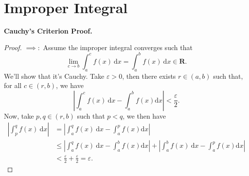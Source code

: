 \documentclass[11pt]{article} %
\theoremstyle{plain}
\newcommand{\R}{\mathbf{R}}
\begin{document}
\section*{Improper Integral}

\textbf{Cauchy's Criterion Proof.}

\begin{proof}
$\implies:$ Assume the improper integral converges such that 
\[\lim_{c\to b}\int_a^c f(x)\ \mathrm{d}x = \int_a^b f(x)\ \mathrm{d}x \in \R.\]
We'll show that it's Cauchy. Take $\varepsilon>0$, then there exists $r\in(a,b)$ such that, for all $c\in(r,b)$, we have
\[\left|\int_a^c f(x)\ \mathrm{d}x- \int_a^b f(x) \mathrm{d}x\right|<\frac{\varepsilon}{2}.\]
Now, take $p,q\in(r,b)$ such that $p<q$, we then have
\begin{align*}
\left|\int_p^q f(x)\ \mathrm{d}x\right| & = \left|\int_a^q f(x)\ \mathrm{d}x- \int_a^p f(x) \mathrm{d}x\right| \\
& \leq \left|\int_a^q f(x)\ \mathrm{d}x- \int_a^b f(x) \mathrm{d}x\right| + \left|\int_a^b f(x)\ \mathrm{d}x- \int_a^p f(x) \mathrm{d}x\right| \\
& < \frac{\varepsilon}{2} + \frac{\varepsilon}{2} = \varepsilon.
\end{align*}


\end{proof}
\end{document}
